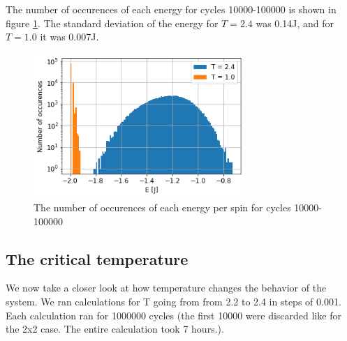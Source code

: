 \documentclass[reprint,english,notitlepage]{revtex4-1}
\begin{document}
	The number of occurences of each energy for cycles 10000-100000 is shown in figure \ref{fig:PE}. The standard deviation of the energy for $T=2.4$ was 0.14J, and for $T=1.0$ it was 0.007J.
	\begin{figure}[H]
		\includegraphics[width=80mm]{../../Code/Figures/PE.png}
		\caption{The number of occurences of each energy per spin for cycles 10000-100000 }
		\label{fig:PE}
	\end{figure}

\subsection{The critical temperature}
	We now take a closer look at how temperature changes the behavior of the system. We ran calculations for T going from from 2.2 to 2.4 in steps of 0.001. Each calculation ran for 1000000 cycles (the first 10000 were discarded like for the 2x2 case. The entire calculation took 7 hours.).
	
\end{document}
